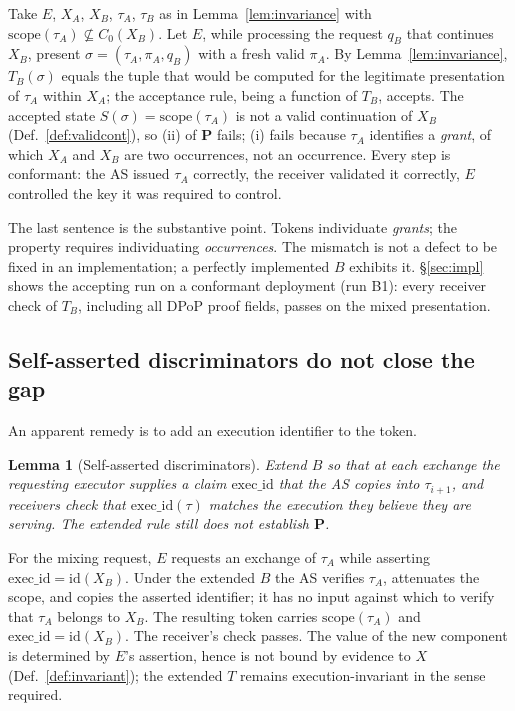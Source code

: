 \documentclass[conference]{IEEEtran}
\newcommand{\scope}{\mathrm{scope}}
\newtheorem{lemma}{Lemma}
\begin{document}
\begin{IEEEproof}
Take $E$, $X_A$, $X_B$, $\tau_A$, $\tau_B$ as in Lemma~\ref{lem:invariance} with $\scope(\tau_A)\not\subseteq C_0(X_B)$. Let $E$, while processing the request $q_B$ that continues $X_B$, present $\sigma=(\tau_A,\pi_A,q_B)$ with a fresh valid $\pi_A$. By Lemma~\ref{lem:invariance}, $T_B(\sigma)$ equals the tuple that would be computed for the legitimate presentation of $\tau_A$ within $X_A$; the acceptance rule, being a function of $T_B$, accepts. The accepted state $S(\sigma)=\scope(\tau_A)$ is not a valid continuation of $X_B$ (Def.~\ref{def:validcont}), so (ii) of $\mathbf{P}$ fails; (i) fails because $\tau_A$ identifies a \emph{grant}, of which $X_A$ and $X_B$ are two occurrences, not an occurrence. Every step is conformant: the AS issued $\tau_A$ correctly, the receiver validated it correctly, $E$ controlled the key it was required to control.
\end{IEEEproof}

The last sentence is the substantive point. Tokens individuate \emph{grants}; the property requires individuating \emph{occurrences}. The mismatch is not a defect to be fixed in an implementation; a perfectly implemented $B$ exhibits it. \S\ref{sec:impl} shows the accepting run on a conformant deployment (run B1): every receiver check of $T_B$, including all DPoP proof fields, passes on the mixed presentation.

\subsection{Self-asserted discriminators do not close the gap}

An apparent remedy is to add an execution identifier to the token.

\begin{lemma}[Self-asserted discriminators]\label{lem:selfasserted}
Extend $B$ so that at each exchange the requesting executor supplies a claim $\mathrm{exec\_id}$ that the AS copies into $\tau_{i+1}$, and receivers check that $\mathrm{exec\_id}(\tau)$ matches the execution they believe they are serving. The extended rule still does not establish $\mathbf{P}$.
\end{lemma}

\begin{IEEEproof}
For the mixing request, $E$ requests an exchange of $\tau_A$ while asserting $\mathrm{exec\_id}=\mathrm{id}(X_B)$. Under the extended $B$ the AS verifies $\tau_A$, attenuates the scope, and copies the asserted identifier; it has no input against which to verify that $\tau_A$ belongs to $X_B$. The resulting token carries $\scope(\tau_A)$ and $\mathrm{exec\_id}=\mathrm{id}(X_B)$. The receiver's check passes. The value of the new component is determined by $E$'s assertion, hence is not bound by evidence to $X$ (Def.~\ref{def:invariant}); the extended $T$ remains execution-invariant in the sense required.
\end{IEEEproof}
\end{document}
